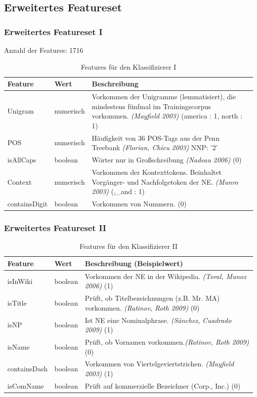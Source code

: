 \documentclass{beamer}
\begin{document}
	\subsection{Erweitertes Featureset}
	\begin{frame}
		\frametitle{Erweitertes Featureset I}
		Anzahl der Features: 1716
 			\begin{table}
 				\caption{Features für den Klassifizierer I}
 				\begin{tabularx}{\textwidth}{llX}
 					\toprule
 					Feature & Wert & Beschreibung\\
 					\midrule
 					Unigram & numerisch & Vorkommen der Unigramme (lemmatisiert), die mindestens fünfmal im Trainingscorpus vorkommen. \textit{(Mayfield 2003)} \color{red}(america : 1, north : 1)\\
 					POS & numerisch  & Häufigkeit von 36 POS-Tags aus der Penn Treebank \textit{(Florian, Chieu 2003)} \color{red}NNP: '2'\\
 					isAllCaps & boolean & Wörter nur in Großschreibung \textit{(Nadeau 2006)} \color{red} (0)\\
 					Context & numerisch & Vorkommen der Kontexttokens. Beinhaltet Vorgänger- und Nachfolgetoken der NE. \textit{(Munro 2003)}  \color{red} (,\_and : 1)\\
 					containsDigit & boolean & Vorkommen von Nummern. \color{red} (0)\textit{}\\
 					\bottomrule
 				\end{tabularx}
 				\label{tab:allf1}
 			\end{table}
 	\end{frame}
 		\begin{frame}
 			\frametitle{Erweitertes Featureset II}
 					\begin{table}
 						\caption{Features für den  Klassifizierer II}
 						\begin{tabularx}{\textwidth}{llX}
 							\toprule
 							Feature & Wert & Beschreibung (Beispielwert)\\
 							\midrule
 							isInWiki & boolean & Vorkommen der NE in der Wikipedia. \textit{(Toral, Munoz 2006)} \color{red} (1)\\
 							isTitle & boolean & Prüft, ob Titelbezeichnungen (z.B. Mr. MA) vorkommen. \textit{(Ratinov, Roth 2009)} (0)\\
 							isNP & boolean & Ist NE eine Nominalphrase. \textit{(Sánchez, Cuadrado 2009)} \color{red} (1)\\
 							isName & boolean & Prüft, ob Vornamen vorkommen.\textit{(Ratinov, Roth 2009)} \color{red}(0)\\
 							containsDash & boolean & Vorkommen von Viertelgeviertstrichen. \textit{(Mayfield 2003)} \color{red}(1) \\
 							isComName & boolean & Prüft auf kommerzielle Bezeichner (Corp., Inc.) \color{red} (0)\\
 							\bottomrule
 						\end{tabularx}
 						\label{tab:allf2}
 					\end{table}
 		\end{frame}
\end{document}
